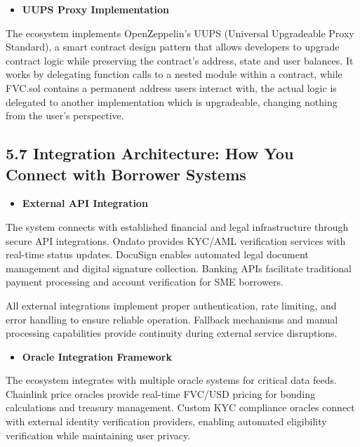 \documentclass[
  paper=a4,
  ,captions=tableheading
]{scrartcl}
\providecommand{\tightlist}{%
  \setlength{\itemsep}{0pt}\setlength{\parskip}{0pt}}
\begin{document}
\begin{itemize}
\tightlist
\item
  \textbf{UUPS Proxy Implementation}
\end{itemize}

The ecosystem implements OpenZeppelin's UUPS (Universal Upgradeable Proxy
Standard), a smart contract design pattern that allows developers to
upgrade contract logic while preserving the contract's address, state
and user balances. It works by delegating function calls to a nested
module within a contract, while FVC.sol contains a permanent address
users interact with, the actual logic is delegated to another
implementation which is upgradeable, changing nothing from the user's
perspective.

\subsection{5.7 Integration Architecture: How You Connect with Borrower
Systems}\label{integration-architecture-how-you-connect-with-borrower-systems}

\begin{itemize}
\tightlist
\item
  \textbf{External API Integration}
\end{itemize}

The system connects with established financial and legal infrastructure
through secure API integrations. Ondato provides KYC/AML verification
services with real-time status updates. DocuSign enables automated legal
document management and digital signature collection. Banking APIs
facilitate traditional payment processing and account verification for
SME borrowers.

All external integrations implement proper authentication, rate
limiting, and error handling to ensure reliable operation. Fallback
mechanisms and manual processing capabilities provide continuity during
external service disruptions.

\begin{itemize}
\tightlist
\item
  \textbf{Oracle Integration Framework}
\end{itemize}

The ecosystem integrates with multiple oracle systems for critical data
feeds. Chainlink price oracles provide real-time FVC/USD pricing for
bonding calculations and treasury management. Custom KYC compliance
oracles connect with external identity verification providers, enabling
automated eligibility verification while maintaining user privacy.
\end{document}
